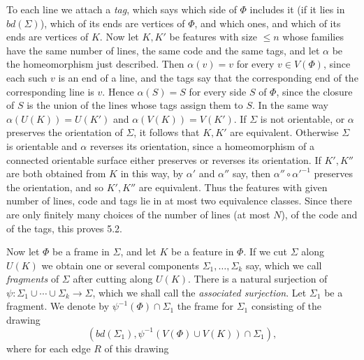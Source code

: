 {To each line we attach a \textit{tag}, which says which side of $\Phi$ includes it (if it lies in $bd(\Sigma)$), which of its ends are vertices of $\Phi$, and which ones, and which of its ends are vertices of $K$. Now let $K, K'$ be features with size $\le n$ whose families have the same number of lines, the same code and the same tags, and let $\alpha$ be the homeomorphism just described. Then $\alpha(v) = v$ for every $v \in V(\Phi)$, since each such $v$ is an end of a line, and the tags say that the corresponding end of the corresponding line is $v$. Hence $\alpha(S) = S$ for every side $S$ of $\Phi$, since the closure of $S$ is the union of the lines whose tags assign them to $S$. In the same way $\alpha(U(K)) = U(K')$ and $\alpha(V(K)) = V(K')$. If $\Sigma$ is not orientable, or $\alpha$ preserves the orientation of $\Sigma$, it follows that $K, K'$ are equivalent. Otherwise $\Sigma$ is orientable and $\alpha$ reverses its orientation, since a homeomorphism of a connected orientable surface either preserves or reverses its orientation. If $K', K''$ are both obtained from $K$ in this way, by $\alpha'$ and $\alpha''$ say, then $\alpha'' \circ \alpha'^{-1}$ preserves the orientation, and so $K', K''$ are equivalent. Thus the features with given number of lines, code and tags lie in at most two equivalence classes. Since there are only finitely many choices of the number of lines (at most $N$), of the code and of the tags, this proves 5.2.}

Now let $\Phi$ be a frame in $\Sigma$, and let $K$ be a feature in $\Phi$. If we cut $\Sigma$ along $U(K)$ we obtain one or several components $\Sigma_1, \dots, \Sigma_k$ say, which we call \textit{fragments} of $\Sigma$ after cutting along $U(K)$. There is a natural surjection of $\psi \colon \Sigma_1 \cup \cdots \cup \Sigma_k \to \Sigma$, which we shall call the \textit{associated surjection}. Let $\Sigma_1$ be a fragment. We denote by $\psi^{-1}(\Phi) \cap \Sigma_1$ the frame for $\Sigma_1$ consisting of the drawing
\begin{equation*}
(bd(\Sigma_1), \psi^{-1}(V(\Phi) \cup V(K)) \cap \Sigma_1),
\end{equation*}
where for each edge $R$ of this drawing
